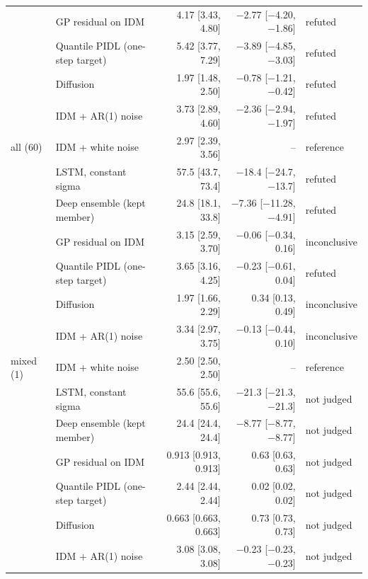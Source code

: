 \begin{table}[htbp]
\begin{tabular}{llrrl}
 & GP residual on IDM & 4.17 [3.43, 4.80] & $-$2.77 [$-$4.20, $-$1.86] & refuted \\
 & Quantile PIDL (one-step target) & 5.42 [3.77, 7.29] & $-$3.89 [$-$4.85, $-$3.03] & refuted \\
 & Diffusion & 1.97 [1.48, 2.50] & $-$0.78 [$-$1.21, $-$0.42] & refuted \\
 & IDM + AR(1) noise & 3.73 [2.89, 4.60] & $-$2.36 [$-$2.94, $-$1.97] & refuted \\
\midrule
all (60) & IDM + white noise & 2.97 [2.39, 3.56] & -- & reference \\
 & LSTM, constant sigma & 57.5 [43.7, 73.4] & $-$18.4 [$-$24.7, $-$13.7] & refuted \\
 & Deep ensemble (kept member) & 24.8 [18.1, 33.8] & $-$7.36 [$-$11.28, $-$4.91] & refuted \\
 & GP residual on IDM & 3.15 [2.59, 3.70] & $-$0.06 [$-$0.34, 0.16] & inconclusive \\
 & Quantile PIDL (one-step target) & 3.65 [3.16, 4.25] & $-$0.23 [$-$0.61, 0.04] & refuted \\
 & Diffusion & 1.97 [1.66, 2.29] & 0.34 [0.13, 0.49] & inconclusive \\
 & IDM + AR(1) noise & 3.34 [2.97, 3.75] & $-$0.13 [$-$0.44, 0.10] & inconclusive \\
\midrule
mixed (1) & IDM + white noise & 2.50 [2.50, 2.50] & -- & reference \\
 & LSTM, constant sigma & 55.6 [55.6, 55.6] & $-$21.3 [$-$21.3, $-$21.3] & not judged \\
 & Deep ensemble (kept member) & 24.4 [24.4, 24.4] & $-$8.77 [$-$8.77, $-$8.77] & not judged \\
 & GP residual on IDM & 0.913 [0.913, 0.913] & 0.63 [0.63, 0.63] & not judged \\
 & Quantile PIDL (one-step target) & 2.44 [2.44, 2.44] & 0.02 [0.02, 0.02] & not judged \\
 & Diffusion & 0.663 [0.663, 0.663] & 0.73 [0.73, 0.73] & not judged \\
 & IDM + AR(1) noise & 3.08 [3.08, 3.08] & $-$0.23 [$-$0.23, $-$0.23] & not judged \\
\bottomrule
\end{tabular}
\end{table}
